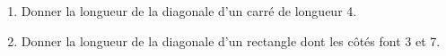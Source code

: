 
\begin{exercice}\label{exosmath-0639}

    \begin{enumerate}
        \item
    Donner la longueur de la diagonale d'un carré de longueur \unit{4}{\centi\meter}.
\item
    Donner la longueur de la diagonale d'un rectangle dont les côtés font \unit{3}{\centi\meter} et \unit{7}{\centi\meter}.
    \end{enumerate}

\end{exercice}
